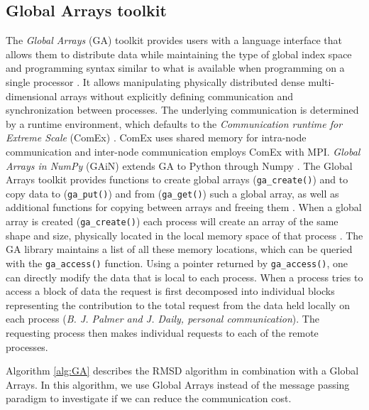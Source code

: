 \subsection{Global Arrays toolkit}
The \emph{Global Arrays} (GA) toolkit provides users with a language interface that allows them to distribute data while maintaining the type of global index space and programming syntax similar to what is available when programming on a single processor \cite{GA}.
It allows manipulating physically distributed dense multi-dimensional arrays without explicitly defining communication and synchronization between processes.
The underlying communication is determined by a runtime environment, which defaults to the \emph{Communication runtime for Extreme Scale} (ComEx) \cite{Daily:2014aa}.
ComEx uses shared memory for intra-node communication and inter-node communication employs ComEx with MPI.
\emph{Global Arrays in NumPy} (GAiN) extends GA to Python through Numpy \cite{GAiN}. 
The Global Arrays toolkit provides functions to create global arrays (\texttt{ga\_create()}) and to copy data to (\texttt{ga\_put()}) and from (\texttt{ga\_get()}) such a global array,  as well as additional functions for copying between arrays and freeing them \cite{GAiN}.
When a global array is created (\texttt{ga\_create()}) each process will create an array of the same shape and size, physically located in the local memory space of that process \cite{GA}. 
The GA library maintains a list of all these memory locations, which can be queried with the \texttt{ga\_access()} function.
Using a pointer returned by \texttt{ga\_access()}, one can directly modify the data that is local to each process.
When a process tries to access a block of data the request is first decomposed into individual blocks representing the contribution to the total request from the data held locally on each process (\textit{B. J. Palmer and J. Daily, personal communication}).
The requesting process then makes individual requests to each of the remote processes. 

Algorithm \ref{alg:GA} describes the RMSD algorithm in combination with a Global Arrays.
In this algorithm, we use Global Arrays instead of the message passing paradigm to investigate if we can reduce the communication cost. 

